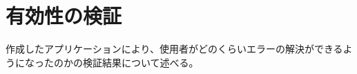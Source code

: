 \documentclass[main]{subfiles}
\begin{document}
\chapter{有効性の検証}
作成したアプリケーションにより、使用者がどのくらいエラーの解決ができるようになったのかの検証結果について述べる。
\end{document}
